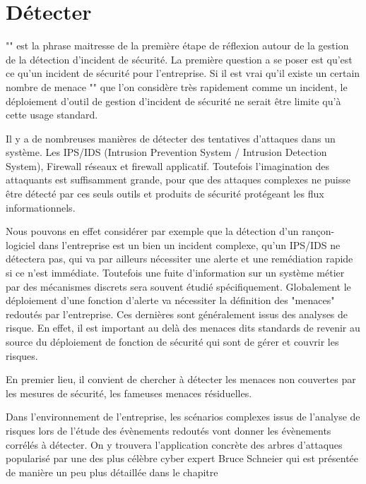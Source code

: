 \section{Détecter}

"" est la phrase maitresse de la première étape de réflexion autour de la gestion de la détection d'incident de sécurité.
La première question a se poser est qu'est ce qu'un incident de sécurité pour l'entreprise. Si il est vrai qu'il existe un certain nombre de menace "" que l'on considère très rapidement comme un incident, le déploiement d'outil de gestion d'incident de sécurité ne serait être limite qu'à cette usage standard.

Il y a de nombreuses manières de détecter des tentatives d'attaques dans un système. Les IPS/IDS (Intrusion Prevention System / Intrusion Detection System), Firewall réseaux et firewall applicatif. Toutefois l'imagination des attaquants est suffisamment grande, pour que des attaques complexes ne puisse être détecté par ces seuls outils et produits de sécurité protégeant les flux informationnels.


Nous pouvons en effet considérer par exemple que la détection d'un rançon-logiciel dans l'entreprise est un bien un incident complexe, qu'un IPS/IDS ne détectera pas,  qui va par ailleurs nécessiter une alerte et une remédiation rapide si ce n'est immédiate.
Toutefois une fuite d'information sur un système métier par des mécanismes discrets sera souvent étudié spécifiquement.
Globalement le déploiement d'une fonction d'alerte va nécessiter la définition des "menaces" redoutés par l'entreprise. 
Ces dernières sont généralement issus des analyses de risque.
En effet, il est important au delà des menaces dits standards de revenir au source du déploiement de fonction de sécurité qui sont de gérer et couvrir les risques.

En premier lieu, il convient de chercher à détecter les menaces non couvertes par les mesures de sécurité, les fameuses menaces résiduelles.

Dans l'environnement de l'entreprise, les scénarios complexes issus de l'analyse de risques lors de l'étude des évènements redoutés vont donner les évènements corrélés à détecter.
On y trouvera l'application concrète des arbres d'attaques popularisé par une des plus célèbre cyber expert Bruce Schneier \cite{schneier1999attack} qui est présentée de manière un peu plus détaillée dans le chapitre 


